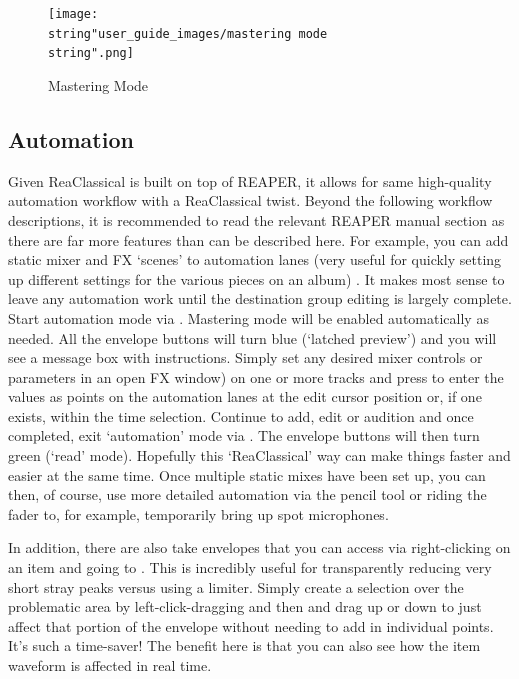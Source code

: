\documentclass[10pt,american]{article}
\begin{document}
\begin{figure}
\texttt{[image: \\string"user\_guide\_images/mastering mode\\string".png]}

\caption{Mastering Mode}

\end{figure}


\subsection{Automation}

Given ReaClassical is built on top of REAPER, it allows for same high-quality
automation workflow with a ReaClassical twist. Beyond the following workflow
descriptions, it is recommended to read the relevant REAPER manual section as
there are far more features than can be described here. For example, you can add
static mixer and FX `scenes' to automation lanes (very useful for quickly
setting up different settings for the various pieces on an album) . It makes
most sense to leave any automation work until the destination group editing is
largely complete. Start automation mode via . Mastering mode will
be enabled automatically as needed. All the envelope buttons will turn blue
(`latched preview') and you will see a message box with instructions. Simply set
any desired mixer controls or parameters in an open FX window) on one or more
tracks and press  to enter the values as points on the automation lanes
at the edit cursor position or, if one exists, within the time selection.
Continue to add, edit or audition and once completed, exit `automation' mode via
. The envelope buttons will then turn green (`read' mode).
Hopefully this `ReaClassical' way can make things faster and easier at the same
time. Once multiple static mixes have been set up, you can then, of course, use
more detailed automation via the pencil tool or riding the fader to, for
example, temporarily bring up spot microphones. 

In addition, there are also take envelopes that you can access via
right-clicking on an item and going to . This
is incredibly useful for transparently reducing very short stray peaks versus
using a limiter. Simply create a selection over the problematic area by
left-click-dragging and then \keys{\ctrl+\shift} and drag up or down to just
affect that portion of the envelope without needing to add in individual points.
It's such a time-saver! The benefit here is that you can also see how the item
waveform is affected in real time.
\end{document}
